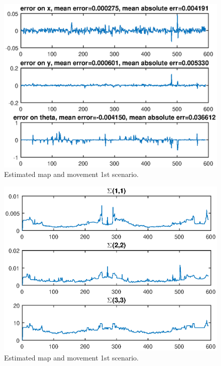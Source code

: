 \documentclass[12pt]{article}
\begin{document}
\begin{figure}[htbp]
 \centering
 \includegraphics[width=\textwidth]{test1_fig2}
 \caption{Estimated map and movement 1st scenario.}
\end{figure}
\begin{figure}[htbp]
 \centering
 \includegraphics[width=\textwidth]{test1_fig3}
 \caption{Estimated map and movement 1st scenario.}
\end{figure}
\end{document}
